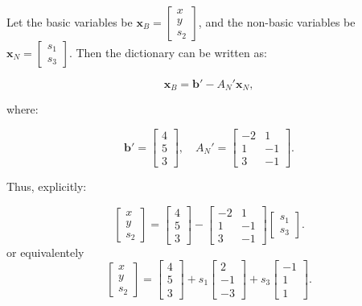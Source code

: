 \begin{tcolorbox}[colback=green!5!white, colframe=green!75!black,    
    width=1\textwidth, %
    box align=center, 
    title=\textbf{Final Dictionary in Matrix Notation}]
Let the basic variables be $\mathbf{x}_B = \begin{bmatrix} x \\ y \\ s_2 \end{bmatrix}$,
and the non-basic variables be $\mathbf{x}_N = \begin{bmatrix} s_1 \\ s_3 \end{bmatrix}$.
Then the dictionary can be written as:

$$
\mathbf{x}_B = \mathbf{b}' - A_N' \mathbf{x}_N,
$$

where:

$$
\mathbf{b}' = 
\begin{bmatrix}
4 \\
5 \\
3
\end{bmatrix}, \quad
A_N' = 
\begin{bmatrix}
-2 & 1 \\
1 & -1 \\
3 & -1
\end{bmatrix}.
$$

Thus, explicitly:

$$
\begin{bmatrix}
x \\
y \\
s_2
\end{bmatrix}
=
\begin{bmatrix}
4 \\
5 \\
3
\end{bmatrix}
-
\begin{bmatrix}
-2 & 1 \\
1 & -1 \\
3 & -1
\end{bmatrix}
\begin{bmatrix}
s_1 \\
s_3
\end{bmatrix}.
$$
or equivalentely
$$
\begin{bmatrix}
x \\
y \\
s_2
\end{bmatrix}
=
\begin{bmatrix}
4 \\
5 \\
3
\end{bmatrix}
+
s_1
\begin{bmatrix}
2  \\
-1  \\
-3 
\end{bmatrix}
 +s_3
\begin{bmatrix}
 -1 \\
 1 \\
 1
\end{bmatrix}.$$
\end{tcolorbox}


